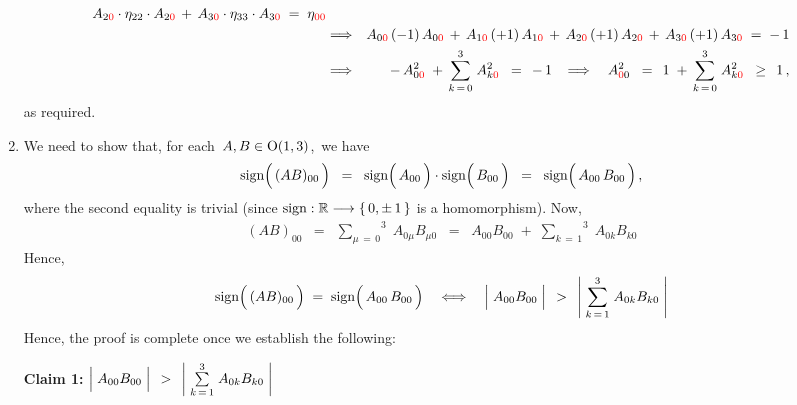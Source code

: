 \begin{enumerate}
\begin{eqnarray*}
		A_{2{\color{red}0}} \cdot \eta_{22} \cdot A_{2{\color{red}0}}
		\,+\,
		A_{3{\color{red}0}} \cdot \eta_{33} \cdot A_{3{\color{red}0}}
		\; = \;
		\eta_{{\color{red}00}}
	\\
	& \Longrightarrow &
		A_{0{\color{red}0}}\,(-1)\,A_{0{\color{red}0}}
		\,+\,
		A_{1{\color{red}0}}\,(+1)\,A_{1{\color{red}0}}
		\,+\,
		A_{2{\color{red}0}}\,(+1)\,A_{2{\color{red}0}}
		\,+\,
		A_{3{\color{red}0}}\,(+1)\,A_{3{\color{red}0}}
		\; = \;
		-\,1
	\\
	& \Longrightarrow &
		- \, A_{0{\color{red}0}}^{2}
		\; + \,
		\overset{3}{\underset{k\,=\,0}{\sum}}\;
		A_{k{\color{red}0}}^{2}
		\;\; = \;\,
			-\,1
	\;\;\; \Longrightarrow \;\;\;\,
		A_{{\color{red}0}0}^{2}
		\;\; = \;\,
			1
			\; + \,
			\overset{3}{\underset{k\,=\,0}{\sum}}\;
			A_{k{\color{red}0}}^{2}
		\;\; \geq \;\,
			1\,,
	\end{eqnarray*}
	as required.
\item
	We need to show that, for each
	\,$A, B \in \textnormal{O}(1,3)$,\,
	we have
	\begin{equation*}
	\textnormal{sign}\!\left(\,\overset{{\color{white}.}}{(AB)_{00}}\,\right)
	\;\; = \;\;
		\textnormal{sign}\!\left(\,\overset{{\color{white}.}}{A_{00}}\,\right)
		\cdot
		\textnormal{sign}\!\left(\,\overset{{\color{white}.}}{B_{00}}\,\right)
	\;\; = \;\;
		\textnormal{sign}\!\left(\,\overset{{\color{white}.}}{A_{00}}\,B_{00}\,\right),
	\end{equation*}
	where the second equality is trivial
	(since $\textnormal{sign} : \Re \longrightarrow \{\,0,\pm\,1\,\}$ is a homomorphism).
	Now,
	\begin{eqnarray*}
	(AB)_{00}
	& = &
		\overset{3}{\underset{\mu\,=\,0}{\sum}}\;
		A_{0\mu}B_{\mu0}
	\;\; = \;\;
		A_{00}B_{00}
		\; + \;
		\overset{3}{\underset{k\,=\,1}{\sum}}\;
		A_{0k}B_{k0}
	\end{eqnarray*}
	Hence,
	\begin{equation*}
	\textnormal{sign}\!\left(\,\overset{{\color{white}.}}{(AB)_{00}}\,\right)
	\; = \;
		\textnormal{sign}\!\left(\,\overset{{\color{white}.}}{A_{00}}\,B_{00}\,\right)
	\quad\Longleftrightarrow\quad
	\left\vert\;
		\overset{{\color{white}.}}{A_{00}B_{00}}
		\;\right\vert
	\;\, > \;\,
		\left\vert\;
			\overset{3}{\underset{k\,=\,1}{\sum}}\;A_{0k}B_{k0}
			\;\right\vert
	\end{equation*}
	Hence, the proof is complete once we establish the following:
	
	\vskip 0.3cm
	\noindent
	\textbf{Claim 1:}\quad
	$\left\vert\;
		\overset{{\color{white}.}}{A_{00}B_{00}}
		\;\right\vert
	\;\, > \;\,
		\left\vert\;
			\overset{3}{\underset{k\,=\,1}{\sum}}\;A_{0k}B_{k0}
			\;\right\vert$


\end{enumerate}
